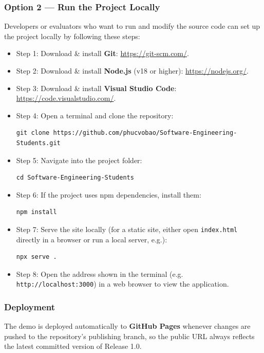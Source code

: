 \subsubsection{Option 2 — Run the Project Locally}

Developers or evaluators who want to run and modify the source code can set up the project locally by following these steps:

\begin{itemize}[nosep]
    \item Step 1: Download \& install \textbf{Git}: \url{https://git-scm.com/}.
    \item Step 2: Download \& install \textbf{Node.js} (v18 or higher): \url{https://nodejs.org/}.
    \item Step 3: Download \& install \textbf{Visual Studio Code}: \url{https://code.visualstudio.com/}.
    \item Step 4: Open a terminal and clone the repository:
\begin{verbatim}
git clone https://github.com/phucvobao/Software-Engineering-Students.git
\end{verbatim}
    \item Step 5: Navigate into the project folder:
\begin{verbatim}
cd Software-Engineering-Students
\end{verbatim}
    \item Step 6: If the project uses npm dependencies, install them:
\begin{verbatim}
npm install
\end{verbatim}
    \item Step 7: Serve the site locally (for a static site, either open \texttt{index.html} directly in a browser or run a local server, e.g.):
\begin{verbatim}
npx serve .
\end{verbatim}
    \item Step 8: Open the address shown in the terminal (e.g. \texttt{http://localhost:3000}) in a web browser to view the application.
\end{itemize}

\subsubsection{Deployment}

The demo is deployed automatically to \textbf{GitHub Pages} whenever changes are pushed to the repository's publishing branch, so the public URL always reflects the latest committed version of Release 1.0.

